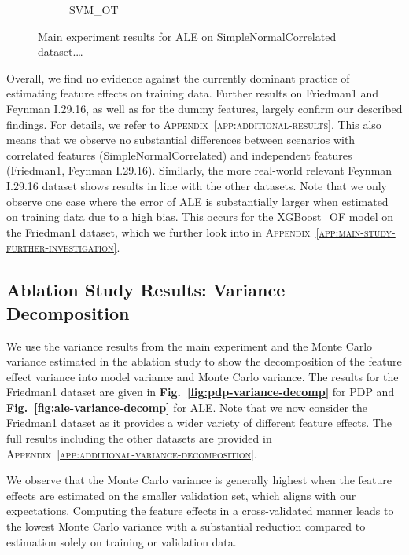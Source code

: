 \documentclass[runningheads]{llncs}
\begin{document}
\begin{figure}[htbp]
\begin{subfigure}[b]{0.49\textwidth}
        \caption{SVM\_OT}
        \label{fig:ale-results-snc-svm-ot}  %
    \end{subfigure}
    \caption{Main experiment results for ALE on SimpleNormalCorrelated dataset.\dots}
    \label{fig:ale-results-snc}  %
\end{figure}

Overall, we find no evidence against the currently dominant practice of
estimating feature effects on training data. Further results on Friedman1 and
Feynman I.29.16, as well as for the dummy features, largely confirm our
described findings. For details, we refer to
\textsc{Appendix~\ref{app:additional-results}}. This also means that we observe
no substantial differences between scenarios with correlated features
(SimpleNormalCorrelated) and independent features (Friedman1, Feynman I.29.16).
Similarly, the more real-world relevant Feynman I.29.16 dataset shows results
in line with the other datasets. Note that we only observe one case where the
error of ALE is substantially larger when estimated on training data due to a
high bias. This occurs for the XGBoost\_OF model on the Friedman1 dataset,
which we further look into in
\textsc{Appendix~\ref{app:main-study-further-investigation}}.

\subsection{Ablation Study Results: Variance Decomposition}\label{sec:results-variance-decomposition}

We use the variance results from the main experiment and the Monte Carlo
variance estimated in the ablation study to show the decomposition of the
feature effect variance into model variance and Monte Carlo variance. The
results for the Friedman1 dataset are given in
\textbf{Fig.\@~\ref{fig:pdp-variance-decomp}} for PDP and
\textbf{Fig.\@~\ref{fig:ale-variance-decomp}} for ALE. Note that we now  %
consider the Friedman1 dataset as it provides a wider variety of different
feature effects. The full results including the other datasets are provided in
\textsc{Appendix~\ref{app:additional-variance-decomposition}}.

We observe that the Monte Carlo variance is generally highest when the feature
effects are estimated on the smaller validation set, which aligns with our
expectations. Computing the feature effects in a cross-validated manner leads
to the lowest Monte Carlo variance with a substantial reduction compared to
estimation solely on training or validation data.
\end{document}
